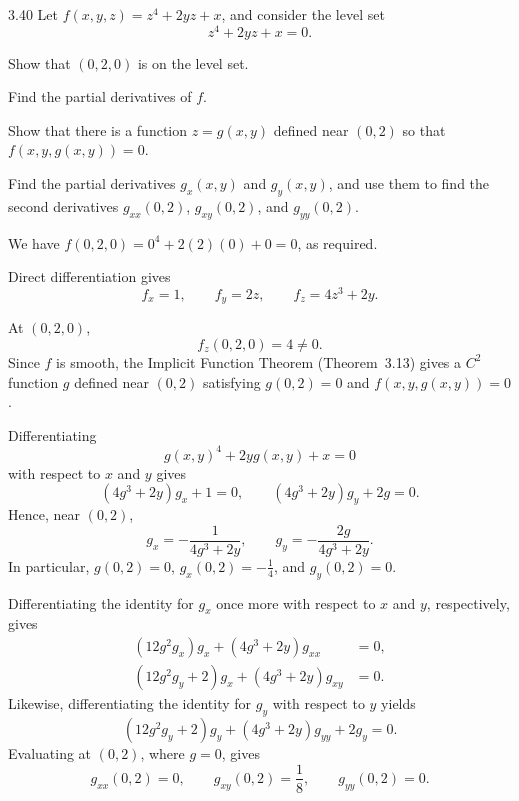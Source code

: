 \documentclass[11pt,oneside]{article}
\begin{document}
\begin{problem}{3.40}
Let $f(x,y,z)=z^4+2yz+x$, and consider the level set
\[
    z^4+2yz+x=0.
\]
\begin{problemsubparts}
    \item Show that $(0,2,0)$ is on the level set.
    \item Find the partial derivatives of $f$.
    \item Show that there is a function $z=g(x,y)$ defined near $(0,2)$ so that $f(x,y,g(x,y))=0$.
    \item Find the partial derivatives $g_x(x,y)$ and $g_y(x,y)$, and use them to find the second derivatives $g_{xx}(0,2)$, $g_{xy}(0,2)$, and $g_{yy}(0,2)$.
\end{problemsubparts}
\end{problem}

\begin{solution}
\begin{problemsubparts}
    \item We have $f(0,2,0)=0^4+2(2)(0)+0=0$, as required.

    \item Direct differentiation gives
    \[
        \boxed{f_x=1,\qquad f_y=2z,\qquad f_z=4z^3+2y}.
    \]

    \item At $(0,2,0)$,
    \[
        f_z(0,2,0)=4\neq0.
    \]
    Since $f$ is smooth, the Implicit Function Theorem (Theorem~3.13) gives a $C^2$ function $g$ defined near $(0,2)$ satisfying $g(0,2)=0$ and $f(x,y,g(x,y))=0$.

    \item Differentiating
    \[
        g(x,y)^4+2yg(x,y)+x=0
    \]
    with respect to $x$ and $y$ gives
    \[
        (4g^3+2y)g_x+1=0,
        \qquad
        (4g^3+2y)g_y+2g=0.
    \]
    Hence, near $(0,2)$,
    \[
        \boxed{g_x=-\frac{1}{4g^3+2y},\qquad
        g_y=-\frac{2g}{4g^3+2y}}.
    \]
    In particular, $g(0,2)=0$, $g_x(0,2)=-\frac14$, and $g_y(0,2)=0$.

    Differentiating the identity for $g_x$ once more with respect to $x$ and $y$, respectively, gives
    \begin{align*}
        (12g^2g_x)g_x+(4g^3+2y)g_{xx}&=0,\\
        (12g^2g_y+2)g_x+(4g^3+2y)g_{xy}&=0.
    \end{align*}
    Likewise, differentiating the identity for $g_y$ with respect to $y$ yields
    \[
        (12g^2g_y+2)g_y+(4g^3+2y)g_{yy}+2g_y=0.
    \]
    Evaluating at $(0,2)$, where $g=0$, gives
    \[
        \boxed{g_{xx}(0,2)=0,\qquad g_{xy}(0,2)=\frac18,\qquad g_{yy}(0,2)=0}.
    \]
\end{problemsubparts}
\end{solution}
\end{document}

